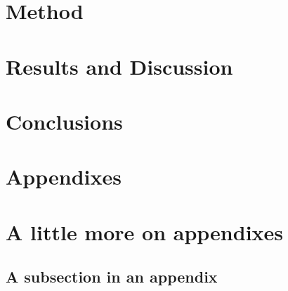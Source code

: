 \documentclass[%
 reprint,
 amsmath,amssymb,
 aps,
]{revtex4-2}
\begin{document}
\section{Method}

\section{Results and Discussion}

\section{Conclusions}





\begin{acknowledgments}

\end{acknowledgments}

\appendix

\section{Appendixes}

\section{A little more on appendixes}


\subsection{\label{app:subsec}A subsection in an appendix}





\end{document}
